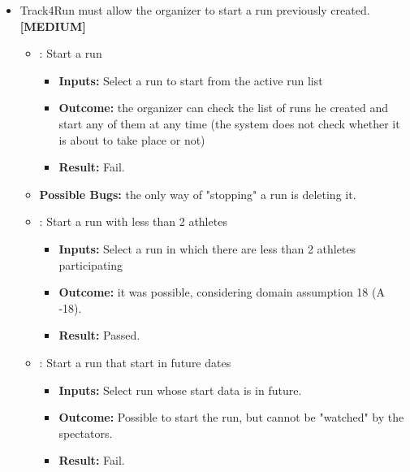 \documentclass[a4paper, hidelinks, 12pt]{report}
\newcommand\requirement[1]{\item[{[REQ-#1]}] }
\newcommand\test[1]{\item[{[TEST-#1]}] }
\begin{document}
\begin{itemize}
\begin{itemize}
	\end{itemize}
	\requirement{26} Track4Run must allow the organizer to start a run previously created. \textbf{[MEDIUM]}
	\begin{itemize}
	\test{17} : Start a run
				\begin{itemize}
			\item \textbf{Inputs: } Select a run to start from the active run list
			\item \textbf{Outcome: } the organizer can check the list of runs he created and start any of them at any time (the system does not check whether it is about to take place or not)
			\item \textbf{Result: } Fail. 
			\end{itemize}
\item{\textbf{Possible Bugs:}} the only way of "stopping" a run is deleting it.

\test{18} : Start a run with less than 2 athletes
				\begin{itemize}
			\item \textbf{Inputs: } Select a run in which there are less than 2 athletes participating
			\item \textbf{Outcome: } it was possible, considering domain assumption 18 (A -18).
			\item \textbf{Result: } Passed. 
			\end{itemize}

\test{19} : Start a run that start in future dates
				\begin{itemize}
			\item \textbf{Inputs: } Select run whose start data is in future. 
			\item \textbf{Outcome: } Possible to start the run, but cannot be "watched" by the spectators.
			\item \textbf{Result: } Fail. 
			\end{itemize}

	\end{itemize}



\end{itemize}
\end{document}
